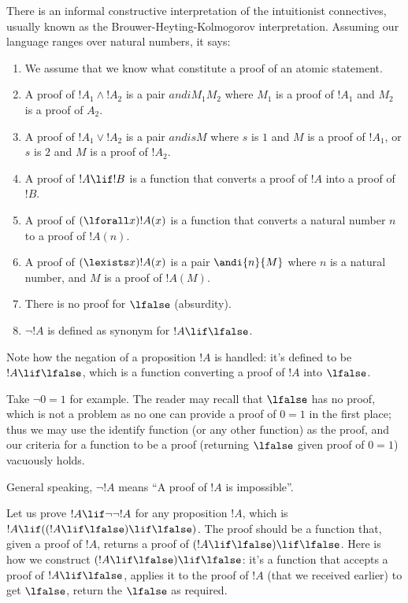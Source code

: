 \documentclass[../../../include/open-logic-section]{subfiles}
\begin{document}

There is an informal constructive interpretation of the intuitionist
connectives, usually known as the Brouwer-Heyting-Kolmogorov
interpretation. Assuming our language ranges over natural numbers, it says:
\begin{enumerate}
\item We assume that we know what constitute a proof of an atomic statement.
\item A proof of $!A_1 \land !A_2$ is a pair $andi{M_1}{M_2}$ where $M_1$ is a
  proof of $!A_1$ and $M_2$ is a proof of $A_2$.
\item A proof of $!A_1 \lor !A_2$ is a pair $andi{s}{M}$ where $s$ is $1$
  and $M$ is a proof of $!A_1$, or $s$ is $2$ and $M$ is a proof of
  $!A_2$.
\item A proof of $!A \lif !B$ is a function that converts a proof
  of $!A$ into a proof of $!B$.
\item A proof of $(\lforall x ) !A(x)$ is a function that converts
  a natural number $n$ to a proof of $!A(n)$.
\item A proof of $(\lexists x) !A(x)$ is a pair $\andi{n}{M}$
  where $n$ is a natural number, and $M$ is a proof of $!A(M)$.
\item There is no proof for $\lfalse$ (absurdity).
\item $\lnot !A$ is defined as synonym for $!A \lif \lfalse$.
\end{enumerate}

Note how the negation of a proposition $!A$ is handled: it's defined to
be $!A \lif \lfalse$, which is a function converting a proof of $!A$
into $\lfalse$.

\begin{ex}
Take $\lnot 0=1$ for example. The reader may recall that $\lfalse$ has no
proof, which is not a problem as no one can provide a proof of $0=1$ in the
first place; thus we may use the identify function (or any other
function) as the proof, and our criteria for a function to be a proof
(returning $\lfalse$ given proof of $0=1$) vacuously holds.
\end{ex}

General speaking, $\lnot !A$ means ``A proof of $!A$ is impossible''.

\begin{ex}
  Let us prove $!A \lif \lnot \lnot !A$ for any proposition $!A$, which is  $!A \lif ((!A
\lif \lfalse) \lif \lfalse)$. The proof should be a function that,
given a proof of $!A$, returns a proof of $(!A \lif \lfalse) \lif
\lfalse$. Here is how we construct $(!A \lif \lfalse) \lif
\lfalse$: it's a function that accepts a proof of $!A \lif
\lfalse$, applies it to the proof of $!A$ (that we received earlier) to
get $\lfalse$, return the $\lfalse$ as required.
\end{ex}
\end{document}
